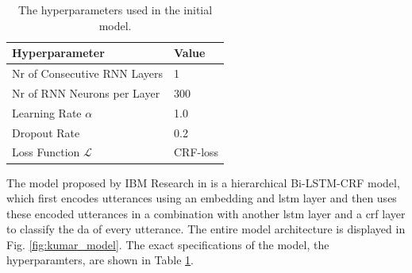     \begin{table}
    \centering
        \begin{tabular}{|l|l|}
        \hline
        \textbf{Hyperparameter}      & \textbf{Value} \\ \hline
        Nr of Consecutive RNN Layers & 1              \\ \hline
        Nr of RNN Neurons per Layer  & 300            \\ \hline
        Learning Rate $\alpha$       & 1.0            \\ \hline
        Dropout Rate\footnotemark                 & 0.2            \\ \hline
        Loss Function $\mathcal{L}$  & CRF-loss\cite{originalCRF} \\ \hline
        \end{tabular}
        \caption{\label{table: da hyperparams} The hyperparameters used in the initial model. }
    \end{table}
    The \gls{model} proposed by IBM Research in \cite{kumar2017dialogue} is a hierarchical Bi-LSTM-CRF \gls{model}, which first encodes \glspl{utterance} using an \gls{embedding} and \gls{lstm} layer and then uses these encoded \glspl{utterance} in a combination with another \gls{lstm} layer and a \gls{crf} layer to classify the \gls{da} of every \gls{utterance}. The entire \gls{model} architecture is displayed in Fig. \ref{fig:kumar_model}. The exact specifications of the model, the hyperparamters, are shown in Table \ref{table: da hyperparams}. 
    

